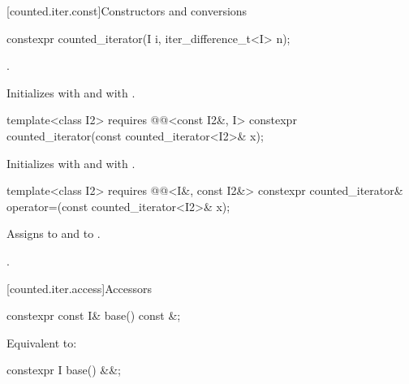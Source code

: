 [counted.iter.const]{Constructors and conversions}

%
\begin{itemdecl}
constexpr counted_iterator(I i, iter_difference_t<I> n);
\end{itemdecl}

\begin{itemdescr}
\pnum
\expects
{}.

\pnum
\effects
Initializes  with  and
 with .
\end{itemdescr}

%
\begin{itemdecl}
template<class I2>
  requires @@<const I2&, I>
    constexpr counted_iterator(const counted_iterator<I2>& x);
\end{itemdecl}

\begin{itemdescr}
\pnum
\effects
Initializes  with  and
 with .
\end{itemdescr}

%
\begin{itemdecl}
template<class I2>
  requires @@<I&, const I2&>
    constexpr counted_iterator& operator=(const counted_iterator<I2>& x);
\end{itemdecl}

\begin{itemdescr}
\pnum
\effects
Assigns  to  and
 to .

\pnum
\returns
{}.
\end{itemdescr}

[counted.iter.access]{Accessors}

%
\begin{itemdecl}
constexpr const I& base() const &;
\end{itemdecl}

\begin{itemdescr}
\pnum
\effects
Equivalent to: 
\end{itemdescr}

%
\begin{itemdecl}
constexpr I base() &&;
\end{itemdecl}


